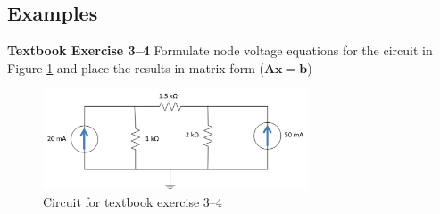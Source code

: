 \documentclass{handout}
\begin{document}
\subsection{Examples}
\textbf{Textbook Exercise 3--4} Formulate node voltage equations for the circuit in Figure \ref{fig: NodalAnalysisEx1} and place the results in matrix form ($\mathbf{Ax}=\mathbf{b}$)
\begin{figure} [h t b]
\centering
\includegraphics[width=0.7\textwidth]{NodalAnalysisEx1.jpg}
\caption{Circuit for textbook exercise 3--4}
\label{fig: NodalAnalysisEx1}
\end{figure}
\end{document}
